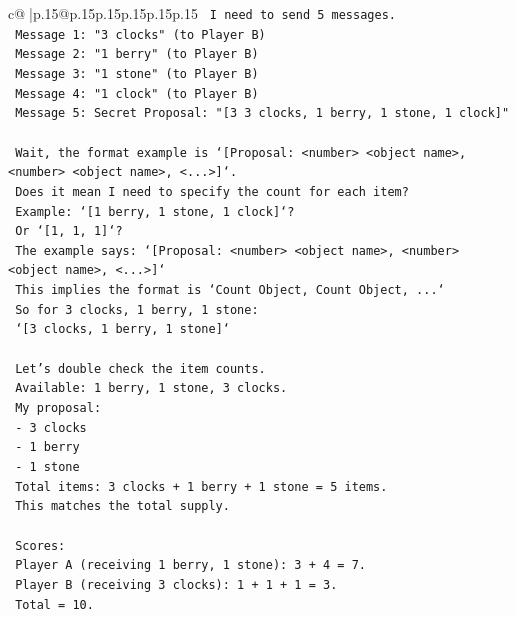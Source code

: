 \documentclass{article}
\begin{document}
{\begin{supertabular}{c@{$\;$}|p{.15\linewidth}@{}p{.15\linewidth}p{.15\linewidth}p{.15\linewidth}p{.15\linewidth}p{.15\linewidth}}
{{{\texttt{    I need to send 5 messages.} \\
\texttt{    Message 1: "3 clocks" (to Player B)} \\
\texttt{    Message 2: "1 berry" (to Player B)} \\
\texttt{    Message 3: "1 stone" (to Player B)} \\
\texttt{    Message 4: "1 clock" (to Player B)} \\
\texttt{    Message 5: Secret Proposal: "{[}3 3 clocks, 1 berry, 1 stone, 1 clock{]}"} \\
\\ 
\texttt{    Wait, the format example is `{[}Proposal: <number> <object name>, <number> <object name>, <...>{]}`.} \\
\texttt{    Does it mean I need to specify the count for each item?} \\
\texttt{    Example: `{[}1 berry, 1 stone, 1 clock{]}`?} \\
\texttt{    Or `{[}1, 1, 1{]}`?} \\
\texttt{    The example says: `{[}Proposal: <number> <object name>, <number> <object name>, <...>{]}`} \\
\texttt{    This implies the format is `Count Object, Count Object, ...`} \\
\texttt{    So for 3 clocks, 1 berry, 1 stone:} \\
\texttt{    `{[}3 clocks, 1 berry, 1 stone{]}`} \\
\\ 
\texttt{    Let's double check the item counts.} \\
\texttt{    Available: 1 berry, 1 stone, 3 clocks.} \\
\texttt{    My proposal:} \\
\texttt{    {-} 3 clocks} \\
\texttt{    {-} 1 berry} \\
\texttt{    {-} 1 stone} \\
\texttt{    Total items: 3 clocks + 1 berry + 1 stone = 5 items.} \\
\texttt{    This matches the total supply.} \\
\\ 
\texttt{    Scores:} \\
\texttt{    Player A (receiving 1 berry, 1 stone): 3 + 4 = 7.} \\
\texttt{    Player B (receiving 3 clocks): 1 + 1 + 1 = 3.} \\
\texttt{    Total = 10.} \\
\\ 
}}}
\end{supertabular}}
\end{document}
